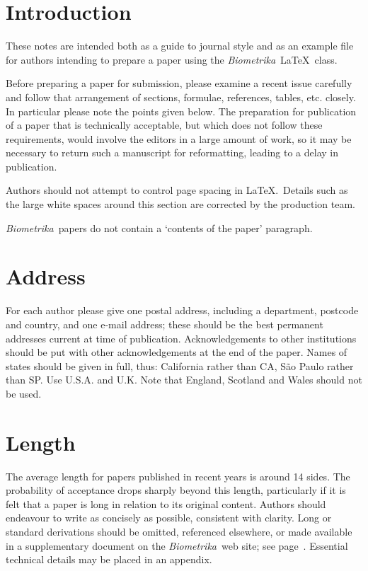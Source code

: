 \documentclass[supplementary,lineno]{biometrika}
\def\Bka{{\it Biometrika}}
\begin{document}

\section{Introduction}

These notes are intended both as a guide to journal style and as an example file for authors intending to prepare a paper using  the \Bka\ \LaTeX\ class.

Before preparing a paper for submission, please examine a recent issue carefully and follow that arrangement of sections, formulae, references, tables, etc. closely. In particular please note the points given below. The preparation for publication of a paper that is technically acceptable, but which does not follow these requirements, would involve the editors in a large amount of work, so it may be necessary to return such a manuscript for reformatting, leading to a delay in publication.

Authors should not attempt to control page spacing in \LaTeX.\  Details such as the large white spaces around this section are corrected by the production team.

\Bka\  papers do not contain a `contents of the paper' paragraph.

\section{Address}

For each author please give one postal address, including a department, postcode and country, and one e-mail address; these should be the best permanent addresses current at time of publication. Acknowledgements to other institutions should be put with other acknowledgements at the end of the paper. Names of states should be given in full, thus: California rather than CA, S\~ao Paulo rather than SP. Use U.S.A. and U.K. Note that England, Scotland and Wales should not be used.

\section{Length}

The average length for papers published in recent years is around 14 sides.  The probability of acceptance drops sharply beyond this length, particularly if it is felt that a paper is long in relation to its original content.  Authors should endeavour to write as concisely as possible,  consistent with clarity.  Long or standard derivations should be omitted, referenced elsewhere, or made available in a supplementary document on the \Bka\ web site; see page~\pageref{SM}.  Essential technical details may be placed in an appendix.
\end{document}
